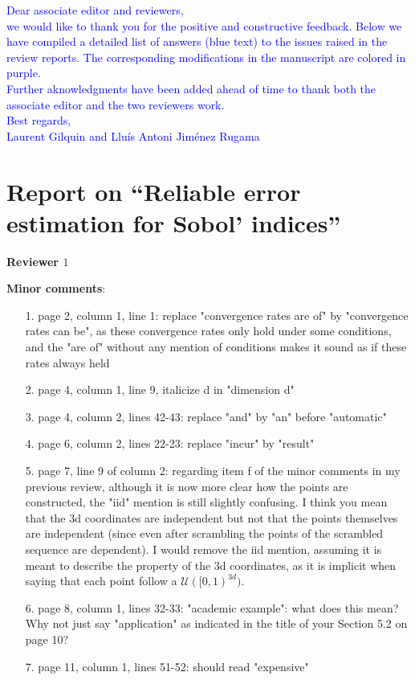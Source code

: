 \documentclass[10pt,a4paper]{article}
\begin{document}
\textcolor{blue}{Dear associate editor and reviewers,\\
we would like to thank you for the positive and constructive feedback. Below we have compiled a detailed list of answers (blue text) to the issues raised in the review reports. The corresponding modifications in the manuscript are colored in purple. \\
Further aknowledgments have been added ahead of time to thank both the associate editor and the two reviewers work.\\
Best regards,\\
Laurent Gilquin and Llu\'{i}s Antoni Jim\'{e}nez Rugama}

\section*{Report on ``Reliable error estimation for Sobol' indices''}


\textbf{\large{Reviewer $1$}}
\vspace*{0.5cm}

\textbf{Minor comments}:

\begin{itemize}

\item[1.] page 2, column 1, line 1: replace "convergence rates are of" by "convergence rates can be", as these convergence rates only hold under some conditions, and the "are of" without any mention of conditions makes it sound as if these rates always held

\item[2.] page 4, column 1, line 9, italicize d in "dimension d"

\item[3.] page 4, column 2, lines 42-43: replace "and" by "an" before "automatic"

\item[4.] page 6, column 2, lines 22-23: replace "incur" by "result"

\item[5.] page 7, line 9 of column 2: regarding item f of the minor comments in my previous review, although it is now more clear how the points are constructed, the "iid" mention is still slightly confusing. I think you mean that the 3d coordinates are independent but not that the points themselves are independent (since even after scrambling the points of the scrambled sequence are dependent). I would remove the iid mention, assuming it is meant to describe the property of the 3d coordinates, as it is implicit when saying that each point follow a $\mathcal{U}([0,1)^{3d})$.

\item[6.] page 8, column 1, lines 32-33: "academic example": what does this mean? Why not just say "application" as indicated in the title of your Section 5.2 on page 10?

\item[7.] page 11, column 1, lines 51-52: should read "expensive"
\end{itemize}
\end{document}
